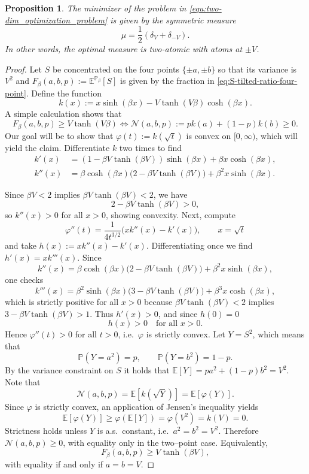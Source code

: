 \documentclass[10pt,a4paper]{amsart}
\newtheorem{proposition}{Proposition}
\newcommand{\bbE}{{\mathbb E}}
\newcommand{\bbP}{{\mathbb P}}
\newcommand{\caN}{{\mathcal N}}
\begin{document}
\begin{proposition}
    \label{prop:minimiser_is_two_point}
    The minimizer of the problem in \eqref{equ:two-dim_optimization_problem} is given by the symmetric measure
    $$\mu = \frac 1 2 (\delta_V + \delta_{-V}).$$
    In other words, the optimal measure is two-atomic with atoms at $\pm V$.
\end{proposition}

\begin{proof}
    Let $S$ be concentrated on the four points $\{\pm a, \pm b\}$ so that its variance is $V^2$ and 
    $F_{\beta}(a,b,p) :=\bbE^{\bbP_\beta}[S]$ is given by the fraction in \eqref{eq:S-tilted-ratio-four-point}. Define the function
    $$k(x) := x \sinh(\beta x) - V\tanh(V \beta) \cosh(\beta x).$$
    A simple calculation shows that
    $$F_\beta (a,b,p) \ge V \tanh(V \beta) \iff \caN(a,b,p):= pk(a) + (1-p)k(b) \ge 0.$$
    Our goal will be to show that $\varphi(t) := k(\sqrt{t})$ is convex on $[0,\infty)$, which will yield the claim. Differentiate $k$ two times to find
    \begin{align*}
k'(x)
&= (1 - \beta V\tanh(\beta V))\sinh(\beta x) 
   + \beta x\cosh(\beta x), \\
k''(x)
&= \beta\cosh(\beta x)\bigl(2 - \beta V\tanh(\beta V)\bigr)
   + \beta^2 x\sinh(\beta x).
\end{align*}

Since $\beta V<2$ implies $\beta V\tanh(\beta V)<2$, we have
\[
2 - \beta V\tanh(\beta V) > 0,
\]
so $k''(x)>0$ for all $x>0$, showing convexity.
Next, compute
\[
\varphi''(t)
= \frac{1}{4 t^{3/2}}\bigl(xk''(x)-k'(x)\bigr),
\qquad x=\sqrt t
\]
and take $h(x):=xk''(x)-k'(x)$. Differentiating once we find
$h'(x)=xk'''(x)$.
Since
\[
k''(x)
= \beta\cosh(\beta x)\bigl(2 - \beta V\tanh(\beta V)\bigr)
  + \beta^2 x\sinh(\beta x),
\]
one checks
\[
k'''(x)
= \beta^2\sinh(\beta x)\bigl(3 - \beta V\tanh(\beta V)\bigr)
  + \beta^3 x\cosh(\beta x),
\]
which is strictly positive for all $x>0$ because  
$\beta V\tanh(\beta V) < 2$ implies  
$3 - \beta V\tanh(\beta V) > 1$.
Thus $h'(x)>0$, and since $h(0)=0$
\[
h(x)>0 \quad\text{for all }x>0.
\]
Hence $\varphi''(t)>0$ for all $t>0$, i.e.\ $\varphi$ is strictly convex.
Let $Y = S^2$, which means that
\[
\mathbb{P}(Y=a^2)=p,\qquad \mathbb{P}(Y=b^2)=1-p.
\]
By the variance constraint on $S$ it holds that
$\mathbb{E}[Y] = p a^2 + (1-p)b^2 = V^2$.
Note that
\[
\mathcal{N}(a,b,p)
= \mathbb{E}[k(\sqrt Y)]
= \mathbb{E}[\varphi(Y)].
\]
Since $\varphi$ is strictly convex, an application of Jensen's inequality yields
\[
\mathbb{E}[\varphi(Y)]
\ge \varphi(\mathbb{E}[Y])
= \varphi(V^2)
= k(V)
= 0.
\]
Strictness holds unless $Y$ is a.s.\ constant, i.e.\ $a^2=b^2=V^2$.
Therefore $\mathcal{N}(a,b,p)\ge 0$, with equality only in the two--point case.  
Equivalently,
\[
F_\beta(a,b,p) \ge V\tanh(\beta V),
\]
with equality if and only if $a=b=V$.
\end{proof}
\end{document}
